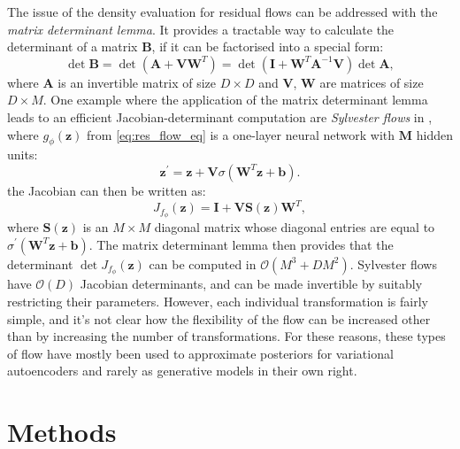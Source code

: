 \documentclass[english]{scrartcl}
\begin{document}
    The issue of the density evaluation for residual flows can be addressed with the \textit{matrix determinant lemma}.
    It provides a tractable way to calculate the determinant of a matrix $\textbf{B}$, if it can be factorised into a special form:
    \begin{equation}
        \det\textbf{B} = \det\left(\textbf{A} + \textbf{V}\textbf{W}^T\right) = \det\left(\textbf{I} + \textbf{W}^T \textbf{A}^{-1}\textbf{V} \right)\det \textbf{A},
    \end{equation}
    where $\textbf{A}$ is an invertible matrix of size $D \times D$ and $\textbf{V}$, $\textbf{W}$ are matrices of size $D \times M$.
    One example where the application of the matrix determinant lemma leads to an efficient Jacobian-determinant computation are \textit{Sylvester flows} in \citet{berg_sylvester_2019}, where $g_{\phi} (\textbf{z})$ from \cref{eq:res_flow_eq} is a one-layer neural network with $\textbf{M}$ hidden units:
    \begin{equation}
        \textbf{z} ^{\prime} = \textbf{z} + \textbf{V} \sigma \left ( \textbf{W}^T \textbf{z} + \textbf{b}\right).
    \end{equation}
    the Jacobian can then be written as:
    \begin{equation}
        J_{f_{\phi}}(\textbf{z}) = \textbf{I} + \textbf{V}\textbf{S}(\textbf{z})\textbf{W}^T,
    \end{equation}
    where $\textbf{S}(\textbf{z})$ is an $M \times M$ diagonal matrix whose diagonal entries are equal to $\sigma ^{\prime} \left( \textbf{W}^T \textbf{z} + \textbf{b} \right)$.
    The matrix determinant lemma then provides that the determinant $\det J_{f_{\phi}}(\textbf{z})$ can be computed in $\mathcal{O}\left( M^3 + DM^2 \right)$.
    Sylvester flows have $\mathcal{O}(D)$ Jacobian determinants, and can be made invertible by suitably restricting their parameters.
    However, each individual transformation is fairly simple, and it's not clear how the flexibility of the flow can be increased other than by increasing the number of transformations.
    For these reasons, these types of flow have mostly been used to approximate posteriors for variational autoencoders and rarely as generative models in their own right.


    \section{Methods}
\end{document}
